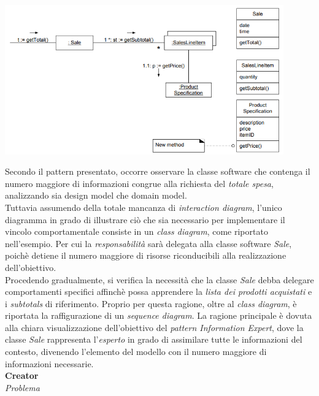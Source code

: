 \documentclass{article}
\begin{document}
\begin{center}
    \includegraphics*[width=0.9\textwidth]{foto 1.png}
\end{center}\vspace*{7pt}
Secondo il pattern presentato, occorre osservare la classe software che contenga il numero maggiore di informazioni congrue alla richiesta del \textit{totale spesa}, analizzando sia design model che domain model.\vspace*{7pt}\\
Tuttavia assumendo della totale mancanza di \textit{interaction diagram}, l'unico diagramma in grado di illustrare ciò che sia necessario per implementare il vincolo comportamentale consiste in un \textit{class diagram}, come riportato nell'esempio. Per cui la \textit{responsabilità} sarà delegata alla classe software \textit{Sale}, poichè detiene il numero maggiore di risorse riconducibili alla realizzazione dell'obiettivo.\vspace*{7pt}\\
Procedendo gradualmente, si verifica la necessità che la classe \textit{Sale} debba delegare comportamenti specifici affinchè possa apprendere la \textit{lista dei prodotti acquistati} e i \textit{subtotals} di riferimento. Proprio per questa ragione, oltre al \textit{class diagram}, è riportata la raffigurazione di un \textit{sequence diagram}. La ragione principale è dovuta alla chiara visualizzazione dell'obiettivo del \textit{pattern Information Expert}, dove la classe \textit{Sale} rappresenta l'\textit{esperto} in grado di assimilare tutte le informazioni del contesto, divenendo l'elemento del modello con il numero maggiore di informazioni necessarie.\vspace*{14pt}\\
\textbf{Creator}\vspace*{7pt}\\
\textit{Problema}\\
\end{document}
